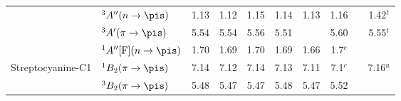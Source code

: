 \begin{tabular}{ll|ccc|ccc|cc}
        &$^3A'' (n \rightarrow \pis)$			&1.13&1.12&1.15&	1.14&1.13&1.16	&		&1.42$^t$\\
        &$^3A' (\pi \rightarrow \pis)$			&5.54&5.54&5.56&	5.51&	&5.60	&		&5.55$^t$\\
        &$^1A'' [\mathrm{F}]	(n \rightarrow \pis)$	&1.70&1.69&1.70&	1.69&1.66	&1.7$^c$	&		&	\\
    Streptocyanine-C1&$^1B_2 (\pi \rightarrow \pis)$ 		&7.14&7.12&7.14&	7.13&7.11&7.1$^c$   &		&7.16$^u$\\
        &	$^3B_2 (\pi \rightarrow \pis)$ 		&5.48&5.47&5.47&	5.48&5.47&5.52	&		&		\\
     \end{tabular}